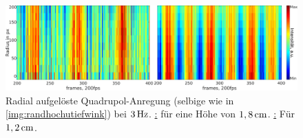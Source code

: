       \begin{figure}[!b]
        \centering
        \includegraphics[width=\textwidth,height=0.38\textwidth]{figs/auswertung/plasmaglw/randhochutiefquad3Hz1sekrad.png}
        \caption{Radial aufgelöste Quadrupol-Anregung (selbige wie in \autoref{img:randhochutiefwink}) bei $\unit[3]{Hz}$. \underline{:} für eine Höhe von $\unit[1,8]{cm}$. \underline{:} Für $\unit[1,2]{cm}$.}
        \label{img:randhochutiefrad}
      \end{figure}

